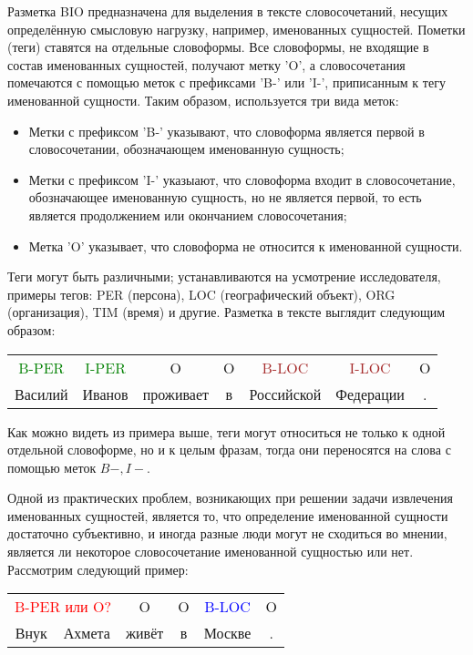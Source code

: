 Разметка BIO предназначена для выделения в тексте словосочетаний, несущих определённую смысловую нагрузку, например, именованных сущностей. Пометки (теги) ставятся на отдельные словоформы. Все словоформы, не входящие в состав именованных сущностей, получают метку 'O', а словосочетания помечаются с помощью меток с префиксами 'B-' или 'I-', приписанным к тегу именованной сущности. Таким образом, используется три вида меток:
\begin{itemize}
\item Метки с префиксом 'B-' указывают, что словоформа является первой в словосочетании, обозначающем именованную сущность;
\item Метки с префиксом 'I-' указыают, что словоформа входит в словосочетание, обозначающее именованную сущность, но не является первой, то есть является продолжением или окончанием словосочетания;
\item Метка 'O' указывает, что словоформа не относится к именованной сущности.
\end{itemize}
 
 
Теги могут быть различными; устанавливаются на усмотрение исследователя, примеры тегов: PER (персона), LOC (географический объект), ORG (организация), TIM (время) и другие. Разметка в тексте выглядит следующим образом:

\begin{tabular}[h]{ccccccc}
\textcolor{green}{B-PER} & \textcolor{green}{I-PER} & O & O & \textcolor{brown}{B-LOC} &  \textcolor{brown}{I-LOC} & O \\
Василий & Иванов & проживает & в & Российской & Федерации & . \\
\end{tabular}

Как можно видеть из примера выше, теги могут относиться не только к одной отдельной словоформе, но и к целым фразам, тогда они переносятся на слова с помощью меток $B-, I-$. 

Одной из практических проблем, возникающих при решении задачи извлечения именованных сущностей, является то, что определение именованной сущности достаточно субъективно, и иногда разные люди могут не сходиться во мнении, является ли некоторое словосочетание именованной сущностью или нет. Рассмотрим следующий пример:

\begin{tabular}[h]{cccccc}
\multicolumn{2}{c}{\textcolor{red}{B-PER или O?}} & O & O & \textcolor{blue}{B-LOC} & O \\
Внук & Ахмета & живёт & в & Москве & . \\
\end{tabular}

